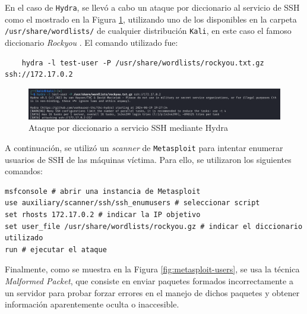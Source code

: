En el caso de \texttt{Hydra}, se llevó a cabo un ataque por diccionario al servicio de \gls{SSH} como el mostrado en la Figura \ref{fig:hydra-ssh}, utilizando uno de los disponibles en la carpeta \texttt{/usr/share/wordlists/} de cualquier distribución \texttt{Kali}, en este caso el famoso diccionario \textit{Rockyou} \cite{kanta2022novel}. El comando utilizado fue:

\begin{center}
\begin{mdframed}
\scriptsize
    \begin{verbatim}
    hydra -l test-user -P /usr/share/wordlists/rockyou.txt.gz ssh://172.17.0.2
    \end{verbatim}
\end{mdframed}
\end{center}

\begin{figure}[H]
        \centering
        \includegraphics[width=1\linewidth]{imagenes/hydra-attack.png}
        \caption{Ataque por diccionario a servicio \gls{SSH} mediante Hydra}
        \label{fig:hydra-ssh}
\end{figure}

A continuación, se utilizó un \textit{scanner} de \texttt{Metasploit} para intentar enumerar usuarios de \gls{SSH} de las máquinas víctima. Para ello, se utilizaron los siguientes comandos:

\begin{center}
\begin{mdframed}
\scriptsize
    \begin{verbatim}
msfconsole # abrir una instancia de Metasploit
use auxiliary/scanner/ssh/ssh_enumusers # seleccionar script
set rhosts 172.17.0.2 # indicar la IP objetivo
set user_file /usr/share/wordlists/rockyou.gz # indicar el diccionario utilizado
run # ejecutar el ataque
    \end{verbatim}
\end{mdframed}
\end{center}

Finalmente, como se muestra en la Figura \ref{fig:metasploit-users}, se usa la técnica \textit{Malformed Packet}, que consiste en enviar paquetes formados incorrectamente a un servidor para probar forzar errores en el manejo de dichos paquetes y obtener información aparentemente oculta o inaccesible.


